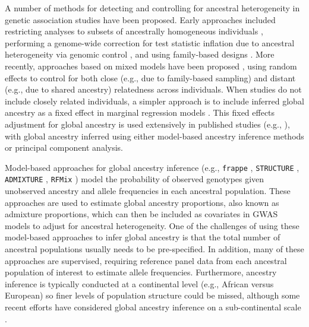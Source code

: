 \documentclass[12pt]{article}
\begin{document}
A number of methods for detecting and controlling for ancestral heterogeneity in genetic association studies have been proposed. 
Early approaches included restricting analyses to subsets of ancestrally homogeneous individuals \citep{lander1994}, performing a genome-wide correction for test statistic inflation due to ancestral heterogeneity via genomic control \citep{GenomicControl}, and using family-based designs \citep{tdt}. 
More recently, approaches based on mixed models have been proposed \citep{yu2006, kang2010, yang2014}, using random effects to control for both close (e.g., due to family-based sampling) and distant (e.g., due to shared ancestry) relatedness across individuals.
When studies do not include closely related individuals, a simpler approach is to include inferred global ancestry as a fixed effect in marginal regression models \citep{eigenstrat, pritchard2000}. 
This fixed effects adjustment for global ancestry is used extensively in published studies (e.g., \citep{wellcome2007, fellay2007, novembre2008, reiner2012, carty2012, pino2015, akenroye2021, conti2021}), with global ancestry inferred using either model-based ancestry inference methods or principal component analysis.

Model-based approaches for global ancestry inference (e.g., \texttt{frappe} \citep{tang2005}, \texttt{STRUCTURE} \cite{structure}, \texttt{ADMIXTURE} \citep{admixture}, \texttt{RFMix} \citep{rfmix}) model the probability of observed genotypes given unobserved ancestry and allele frequencies in each ancestral population. 
These approaches are used to estimate global ancestry proportions, also known as admixture proportions, which can then be included as covariates in GWAS models to adjust for ancestral heterogeneity.
One of the challenges of using these model-based approaches to infer global ancestry is that the total number of ancestral populations usually needs to be pre-specified. 
In addition, many of these approaches are supervised, requiring reference panel data from each ancestral population of interest to estimate allele frequencies.
Furthermore, ancestry inference is typically conducted at a continental level (e.g., African versus European) so finer levels of population structure could be missed, although some recent efforts have considered global ancestry inference on a sub-continental scale \citep{finestructure, durand2014}.
\end{document}
